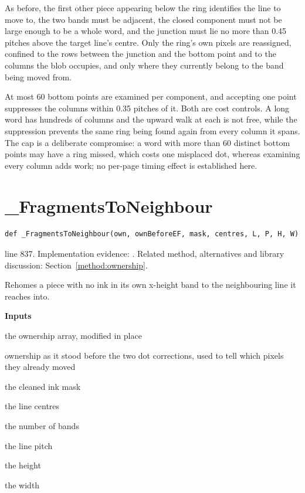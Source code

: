 As before, the first other piece appearing below the ring identifies the line to move to, the two bands must be adjacent, the closed component must not be large enough to be a whole word, and the junction must lie no more than 0.45 pitches above the target line's centre. Only the ring's own pixels are reassigned, confined to the rows between the junction and the bottom point and to the columns the blob occupies, and only where they currently belong to the band being moved from.


At most 60 bottom points are examined per component, and accepting one point suppresses the columns within 0.35 pitches of it. Both are cost controls. A long word has hundreds of columns and the upward walk at each is not free, while the suppression prevents the same ring being found again from every column it spans. The cap is a deliberate compromise: a word with more than 60 distinct bottom points may have a ring missed, which costs one misplaced dot, whereas examining every column adds work; no per-page timing effect is established here.



\section{\_FragmentsToNeighbour}\label{fn:segment:-FragmentsToNeighbour}
\begin{lstlisting}[style=sig]
def _FragmentsToNeighbour(own, ownBeforeEF, mask, centres, L, P, H, W)
\end{lstlisting}
 line 837. Implementation evidence: \cite{code2026}. Related method, alternatives and library discussion: Section~\ref{method:ownership}.


Rehomes a piece with no ink in its own x-height band to the neighbouring line it reaches into.




\noindent\textbf{Inputs}
\begin{description}[leftmargin=2.2em,style=nextline,font=\normalfont\ttfamily]\setlength\itemsep{1pt}
  \item[{own}] \normalfont the ownership array, modified in place
  \item[{ownBeforeEF}] \normalfont ownership as it stood before the two dot corrections, used to tell which pixels they already moved
  \item[{mask}] \normalfont the cleaned ink mask
  \item[{centres}] \normalfont the line centres
  \item[{L}] \normalfont the number of bands
  \item[{P}] \normalfont the line pitch
  \item[{H}] \normalfont the height
  \item[{W}] \normalfont the width
\end{description}


